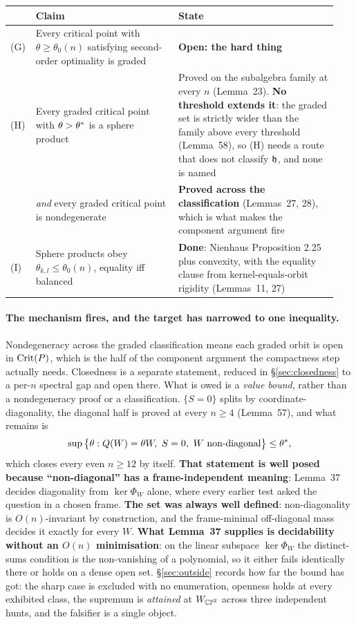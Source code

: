 \begin{center}
\begin{tabular}{@{}p{0.05\linewidth}p{0.42\linewidth}p{0.47\linewidth}@{}}
\toprule
& \textbf{Claim} & \textbf{State} \\
\midrule
(G) & Every critical point with $\theta\ge\theta_0(n)$ satisfying second-order optimality is graded & \textbf{Open: the hard thing} \\
(H) & Every graded critical point with $\theta>\theta^{*}$ is a sphere product & Proved on the subalgebra family at every $n$ (Lemma~23). \textbf{No threshold extends it}: the graded set is strictly wider than the family above every threshold (Lemma~58), so (H) needs a route that does not classify $\mathfrak{h}$, and none is named \\
 & \emph{and} every graded critical point is nondegenerate & \textbf{Proved across the classification} (Lemmas~27, 28), which is what makes the component argument fire \\
(I) & Sphere products obey $\theta_{k,l}\le\theta_0(n)$, equality iff balanced & \textbf{Done}: Nienhaus Proposition 2.25 plus convexity, with the equality clause from kernel-equals-orbit rigidity (Lemmas~11, 27) \\
\bottomrule
\end{tabular}
\end{center}

\paragraph{The mechanism fires, and the target has narrowed to one inequality.} Nondegeneracy across the graded classification means each graded orbit is open in $\mathrm{Crit}(P)$, which is the half of the component argument the compactness step actually needs. Closedness is a separate statement, reduced in \S\ref{sec:closedness} to a per-$n$ spectral gap and open there. What is owed is a \emph{value bound}, rather than a nondegeneracy proof or a classification. $\{S=0\}$ splits by coordinate-diagonality, the diagonal half is proved at every $n\ge4$ (Lemma~57), and what remains is
\[
\sup\big\{\theta:Q(W)=\theta W,\ S=0,\ W\text{ non-diagonal}\big\}\le\theta^{*} ,
\]
which closes every even $n\ge12$ by itself. \textbf{That statement is well posed because ``non-diagonal'' has a frame-independent meaning}: Lemma~37 decides diagonality from $\ker\Phi_W$ alone, where every earlier test asked the question in a chosen frame. \textbf{The set was always well defined}: non-diagonality is $O(n)$-invariant by construction, and the frame-minimal off-diagonal mass decides it exactly for every $W$. \textbf{What Lemma~37 supplies is decidability without an $O(n)$ minimisation}: on the linear subspace $\ker\Phi_W$ the distinct-sums condition is the non-vanishing of a polynomial, so it either fails identically there or holds on a dense open set. \S\ref{sec:outside} records how far the bound has got: the sharp case is excluded with no enumeration, openness holds at every exhibited class, the supremum is \emph{attained} at $W_{\mathbb{CP}^2}$ across three independent hunts, and the falsifier is a single object.

